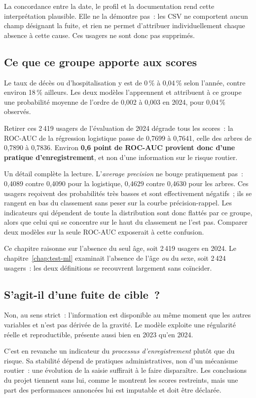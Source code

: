 La concordance entre la date, le profil et la documentation rend cette interprétation
plausible. Elle ne la démontre pas~: les CSV ne comportent aucun champ désignant la
fuite, et rien ne permet d'attribuer individuellement chaque absence à cette cause.
Ces usagers ne sont donc pas supprimés.

\subsection{Ce que ce groupe apporte aux scores}
Le taux de décès ou d'hospitalisation y est de 0\,\% à 0,04\,\% selon l'année, contre
environ 18\,\% ailleurs. Les deux modèles l'apprennent et attribuent à ce groupe une
probabilité moyenne de l'ordre de 0,002 à 0,003 en 2024, pour 0,04\,\% observés.


Retirer ces 2\,419 usagers de l'évaluation de 2024 dégrade tous les scores~: la ROC-AUC
de la régression logistique passe de 0,7699 à 0,7641, celle des arbres de 0,7890 à
0,7836. Environ \textbf{0,6 point de ROC-AUC provient donc d'une pratique
d'enregistrement}, et non d'une information sur le risque routier.

Un détail complète la lecture. L'\textit{average precision} ne bouge pratiquement pas~:
0,4089 contre 0,4090 pour la logistique, 0,4629 contre 0,4630 pour les arbres. Ces
usagers reçoivent des probabilités très basses et sont effectivement négatifs~; ils se
rangent en bas du classement sans peser sur la courbe précision-rappel. Les indicateurs
qui dépendent de toute la distribution sont donc flattés par ce groupe, alors que celui
qui se concentre sur le haut du classement ne l'est pas. Comparer deux modèles sur la
seule ROC-AUC exposerait à cette confusion.

Ce chapitre raisonne sur l'absence du seul âge, soit 2\,419 usagers en 2024. Le
chapitre~\ref{chap:test-ml} examinait l'absence de l'âge \emph{ou} du sexe, soit
2\,424 usagers~: les deux définitions se recouvrent largement sans coïncider.

\subsection{S'agit-il d'une fuite de cible~?}
Non, au sens strict~: l'information est disponible au même moment que les autres
variables et n'est pas dérivée de la gravité. Le modèle exploite une régularité
réelle et reproductible, présente aussi bien en 2023 qu'en 2024.

C'est en revanche un indicateur du \emph{processus d'enregistrement} plutôt que du
risque. Sa stabilité dépend de pratiques administratives, non d'un mécanisme routier~:
une évolution de la saisie suffirait à le faire disparaître. Les conclusions du projet
tiennent sans lui, comme le montrent les scores restreints, mais une part des
performances annoncées lui est imputable et doit être déclarée.

